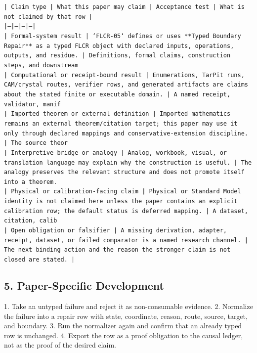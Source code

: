 \documentclass[11pt]{article}
\begin{document}
\noindent\texttt{| Claim type | What this paper may claim | Acceptance test | What is not claimed by that row |}\\
\noindent\texttt{|---|---|---|---|}\\
\noindent\texttt{| Formal-system result | `FLCR-05` defines or uses **Typed Boundary Repair** as a typed FLCR object with declared inputs, operations, outputs, and residue. | Definitions, formal claims, construction steps, and downstream}\\
\noindent\texttt{| Computational or receipt-bound result | Enumerations, TarPit runs, CAM/crystal routes, verifier rows, and generated artifacts are claims about the stated finite or executable domain. | A named receipt, validator, manif}\\
\noindent\texttt{| Imported theorem or external definition | Imported mathematics remains an external theorem/citation target; this paper may use it only through declared mappings and conservative-extension discipline. | The source theor}\\
\noindent\texttt{| Interpretive bridge or analogy | Analog, workbook, visual, or translation language may explain why the construction is useful. | The analogy preserves the relevant structure and does not promote itself into a theorem. }\\
\noindent\texttt{| Physical or calibration-facing claim | Physical or Standard Model identity is not claimed here unless the paper contains an explicit calibration row; the default status is deferred mapping. | A dataset, citation, calib}\\
\noindent\texttt{| Open obligation or falsifier | A missing derivation, adapter, receipt, dataset, or failed comparator is a named research channel. | The next binding action and the reason the stronger claim is not closed are stated. | }\\

\subsection*{5. Paper-Specific Development}

1. Take an untyped failure and reject it as non-consumable evidence.
2. Normalize the failure into a repair row with state, coordinate, reason, route, source, target, and boundary.
3. Run the normalizer again and confirm that an already typed row is unchanged.
4. Export the row as a proof obligation to the causal ledger, not as the proof of the desired claim.
\end{document}
